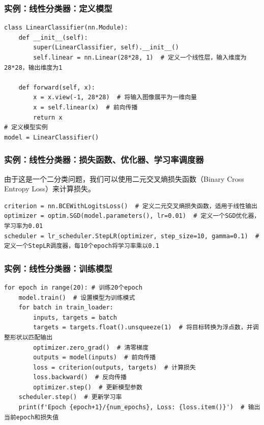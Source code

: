 \begin{frame}[fragile]
    \frametitle{实例：线性分类器：定义模型}

    \begin{verbatim}
class LinearClassifier(nn.Module):
    def __init__(self):
        super(LinearClassifier, self).__init__()
        self.linear = nn.Linear(28*28, 1)  # 定义一个线性层，输入维度为28*28，输出维度为1

    def forward(self, x):
        x = x.view(-1, 28*28)  # 将输入图像展平为一维向量
        x = self.linear(x)  # 前向传播
        return x
# 定义模型实例
model = LinearClassifier()
    \end{verbatim}

\end{frame}

\begin{frame}[fragile]
    \frametitle{实例：线性分类器：损失函数、优化器、学习率调度器}

    由于这是一个二分类问题，我们可以使用二元交叉熵损失函数（Binary Cross Entropy Loss）来计算损失。

    \begin{verbatim}
criterion = nn.BCEWithLogitsLoss()  # 定义二元交叉熵损失函数，适用于线性输出
optimizer = optim.SGD(model.parameters(), lr=0.01)  # 定义一个SGD优化器，学习率为0.01
scheduler = lr_scheduler.StepLR(optimizer, step_size=10, gamma=0.1)  # 定义一个StepLR调度器，每10个epoch将学习率乘以0.1
    \end{verbatim}

\end{frame}

\begin{frame}[fragile]
    \frametitle{实例：线性分类器：训练模型}

    \begin{verbatim}
for epoch in range(20): # 训练20个epoch
    model.train()  # 设置模型为训练模式
    for batch in train_loader:
        inputs, targets = batch
        targets = targets.float().unsqueeze(1)  # 将目标转换为浮点数，并调整形状以匹配输出
        optimizer.zero_grad()  # 清零梯度
        outputs = model(inputs)  # 前向传播
        loss = criterion(outputs, targets)  # 计算损失
        loss.backward()  # 反向传播
        optimizer.step()  # 更新模型参数
    scheduler.step()  # 更新学习率
    print(f'Epoch {epoch+1}/{num_epochs}, Loss: {loss.item()}')  # 输出当前epoch和损失值
    \end{verbatim}
\end{frame}

